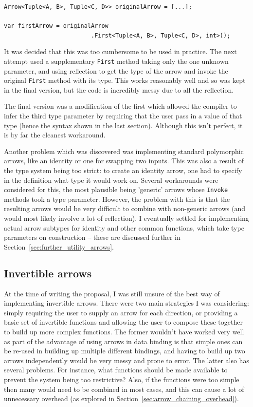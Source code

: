 \documentclass[12pt,twoside,notitlepage]{report}
\begin{document}
\begin{lstlisting}[language={[Sharp]C}]
Arrow<Tuple<A, B>, Tuple<C, D>> originalArrow = [...];

var firstArrow = originalArrow
                         .First<Tuple<A, B>, Tuple<C, D>, int>();
\end{lstlisting}

It was decided that this was too cumbersome to be used in practice. The next attempt used a supplementary \texttt{First} method taking only the one unknown parameter, and using reflection to get the type of the arrow and invoke the original \texttt{First} method with its type. This works reasonably well and so was kept in the final version, but the code is incredibly messy due to all the reflection.

The final version was a modification of the first which allowed the compiler to infer the third type parameter by requiring that the user pass in a value of that type (hence the syntax shown in the last section). Although this isn't perfect, it is by far the cleanest workaround.

Another problem which was discovered was implementing standard polymorphic arrows, like an identity or one for swapping two inputs. This was also a result of the type system being too strict: to create an identity arrow, one had to specify in the definition what type it would work on. Several workarounds were considered for this, the most plausible being 'generic' arrows whose \texttt{Invoke} methods took a type parameter. However, the problem with this is that the resulting arrows would be very difficult to combine with non-generic arrows (and would most likely involve a lot of reflection). I eventually settled for implementing actual arrow subtypes for identity and other common functions, which take type parameters on construction -- these are discussed further in Section~\ref{sec:further_utility_arrows}.

\subsection{Invertible arrows}

At the time of writing the proposal, I was still unsure of the best way of implementing invertible arrows. There were two main strategies I was considering: simply requiring the user to supply an arrow for each direction, or providing a basic set of invertible functions and allowing the user to compose these together to build up more complex functions. The former wouldn't have worked very well as part of the advantage of using arrows in data binding is that simple ones can be re-used in building up multiple different bindings, and having to build up two arrows independently would be very messy and prone to error. The latter also has several problems. For instance, what functions should be made available to prevent the system being too restrictive? Also, if the functions were too simple then many would need to be combined in most cases, and this can cause a lot of unnecessary overhead (as explored in Section~\ref{sec:arrow_chaining_overhead}).
\end{document}
